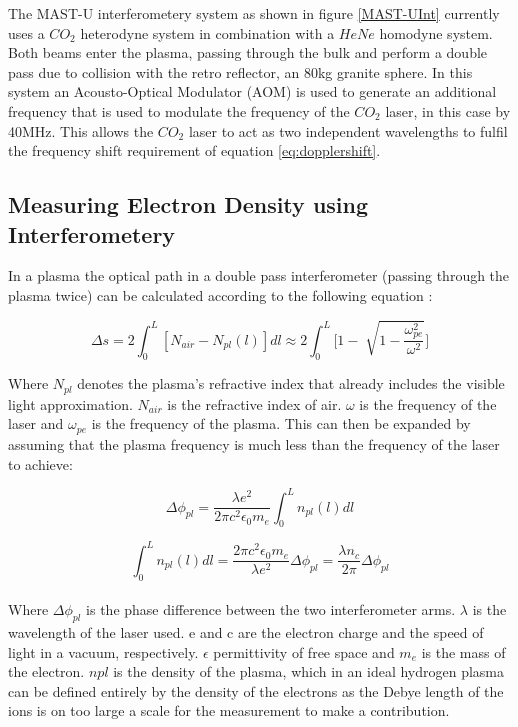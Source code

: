 \documentclass[12pt,a4paper,oneside]{report}
\begin{document}
The MAST-U interferometery system as shown in figure \autoref{MAST-UInt} currently uses a $CO_{2}$ heterodyne system in combination with a $HeNe$ homodyne system. Both beams enter the plasma, passing through the bulk and perform a double pass due to collision with the retro reflector, an 80kg granite sphere. In this system an Acousto-Optical Modulator (AOM) is used to generate an additional frequency that is used to modulate the frequency of the $CO_{2}$ laser, in this case by 40MHz. This allows the $CO_{2}$ laser to act as two independent wavelengths to fulfil the frequency shift requirement of equation \ref{eq:dopplershift}.

    \subsection{Measuring Electron Density using Interferometery}
In a plasma the optical path in a double pass interferometer (passing through the plasma twice) can be calculated according to the following equation \cite[p.~26]{Brunner2017} :

\begin{equation}
	\Delta s = 2 \int_{0}^{L} [N_{air} - N_{pl}(l)]dl \approx 2 \int_{0}^{L} \Bigg[1 - \sqrt[]{1-\frac{\omega_{pe}^{2}}{\omega^{2}}}\Bigg]
	\label{eq:opticalpathint}
\end{equation}

Where $N_{pl}$ denotes the plasma's refractive index that already includes the visible light approximation. $N_{air}$ is the refractive index of air. $\omega$ is the frequency of the laser and $\omega_{pe}$ is the frequency of the plasma. This can then be expanded by assuming that the plasma frequency is much less than the frequency of the laser to achieve:

\begin{equation}
	\Delta\phi_{pl} = \frac{\lambda e^{2}}{2 \pi c^{2} \epsilon_{0} m_{e}} \int_{0}^{L} n_{pl} (l) dl
	\label{eq:plasmaphase}
\end{equation}

\begin{equation}
	\int_{0}^{L} n_{pl} (l) dl = \frac{2 \pi c^{2} \epsilon_{0} m_{e}}{\lambda e^{2}} \Delta\phi_{pl} = \frac{\lambda n_{c}}{2 \pi} \Delta\phi_{pl}
	\label{eq:phaseintegral}
\end{equation}
\\
Where $\Delta\phi_{pl}$ is the phase difference between the two interferometer arms. $\lambda$ is the wavelength of the laser used. e and c are the electron charge and the speed of light in a vacuum, respectively. $\epsilon$ permittivity of free space and $m_{e}$ is the mass of the electron. $n{pl}$ is the density of the plasma, which in an ideal hydrogen plasma can be defined entirely by the density of the electrons as the Debye length of the ions is on too large a scale for the measurement to make a contribution. 
\end{document}
